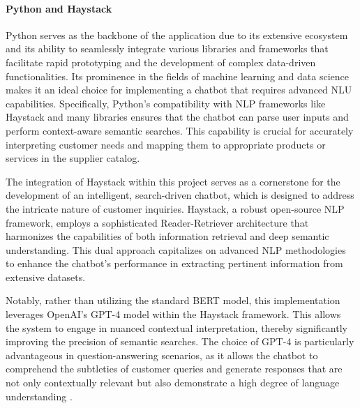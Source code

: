 \paragraph{Python and Haystack}

Python serves as the backbone of the application due to its extensive ecosystem and its ability to seamlessly integrate
various libraries and frameworks that facilitate rapid prototyping and the development of complex data-driven
functionalities.\autocite[cf.][p. 12]{shrivastavaDesignImplementationChatbot}
\autocite[cf.][pp. 240--241]{christensenPythonPipelineRapid2022} Its prominence in the fields of machine
learning and data science makes it an ideal choice for implementing a chatbot that requires advanced \ac{NLU}
capabilities.\autocite[cf.][p. 1]{lortiePythonModernData2022}\autocite[cf.][p. 85]{joshiOverviewPythonLibraries}
Specifically, Python's compatibility with \acs{NLP} frameworks like Haystack and many libraries ensures that
the chatbot can parse user inputs and perform context-aware semantic searches.
\autocite[cf.][p. 21]{fareezPOPULARPYTHONLIBRARIES2020} This capability is crucial for accurately interpreting customer
needs and mapping them to appropriate products or services in the supplier catalog.

The integration of Haystack within this project serves as a cornerstone for the development of an intelligent,
search-driven chatbot, which is designed to address the intricate nature of customer inquiries. Haystack, a robust
open-source \acs{NLP} framework, employs a sophisticated Reader-Retriever architecture that
harmonizes the capabilities of both information retrieval and deep semantic understanding. This dual approach
capitalizes on advanced \acs{NLP} methodologies to enhance the chatbot’s performance in extracting pertinent information
from extensive datasets\autocite[cf.][p. 236]{krishnamoorthyEvolutionReadingComprehension2021}.

Notably, rather than utilizing the standard BERT model, this implementation leverages OpenAI’s GPT-4 model within the
Haystack framework. This allows the system to engage in nuanced contextual interpretation, thereby significantly
improving the precision of semantic searches. The choice of GPT-4 is particularly advantageous in question-answering
scenarios, as it allows the chatbot to comprehend the subtleties of customer queries and generate responses that are not
only contextually relevant but also demonstrate a high degree of language understanding
\autocite[cf.][pp. 943--944]{syedQuestionAnsweringChatbot2021}.

